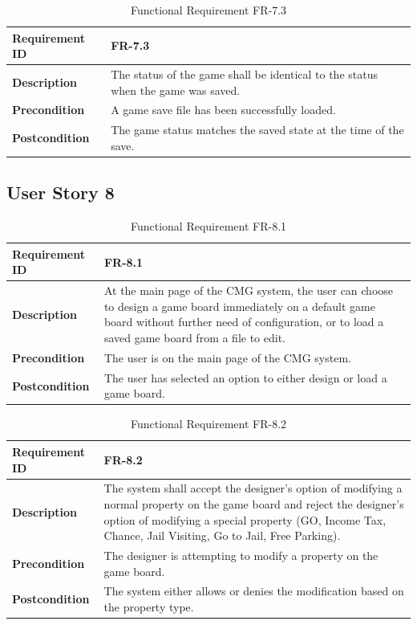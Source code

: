 \documentclass{article}
\begin{document}
\begin{table}[ht]
    \centering
    \caption{Functional Requirement FR-7.3}
    \begin{tabular}{@{}P{3cm}P{12cm}@{}}
        \toprule
        \textbf{Requirement ID} & FR-7.3 \\ \midrule
        \textbf{Description} & The status of the game shall be identical to the status when the game was saved. \\ \midrule
        \textbf{Precondition} & A game save file has been successfully loaded. \\ \midrule
        \textbf{Postcondition} & The game status matches the saved state at the time of the save. \\ \bottomrule
    \end{tabular}
\end{table}

\clearpage
\subsection{User Story 8}

\begin{table}[ht]
    \centering
    \caption{Functional Requirement FR-8.1}
    \begin{tabular}{@{}P{3cm}P{12cm}@{}}
        \toprule
        \textbf{Requirement ID} & FR-8.1 \\ \midrule
        \textbf{Description} & At the main page of the CMG system, the user can choose to design a game board immediately on a default game board without further need of configuration, or to load a saved game board from a file to edit. \\ \midrule
        \textbf{Precondition} & The user is on the main page of the CMG system. \\ \midrule
        \textbf{Postcondition} & The user has selected an option to either design or load a game board. \\ \bottomrule
    \end{tabular}
\end{table}

\begin{table}[ht]
    \centering
    \caption{Functional Requirement FR-8.2}
    \begin{tabular}{@{}P{3cm}P{12cm}@{}}
        \toprule
        \textbf{Requirement ID} & FR-8.2 \\ \midrule
        \textbf{Description} & The system shall accept the designer’s option of modifying a normal property on the game board and reject the designer’s option of modifying a special property (GO, Income Tax, Chance, Jail Visiting, Go to Jail, Free Parking). \\ \midrule
        \textbf{Precondition} & The designer is attempting to modify a property on the game board. \\ \midrule
        \textbf{Postcondition} & The system either allows or denies the modification based on the property type. \\ \bottomrule
    \end{tabular}
\end{table}
\end{document}
